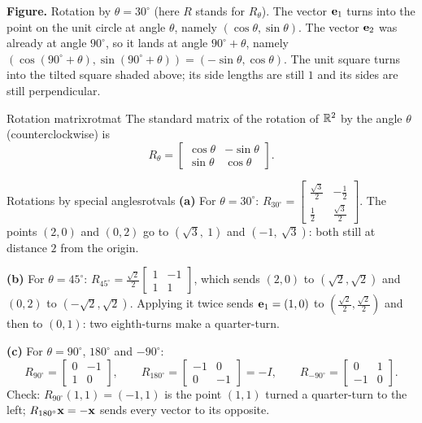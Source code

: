 \documentclass[11pt]{article}
\begin{document}
\textbf{Figure.} Rotation by $\theta=30^\circ$ (here $R$ stands for $R_\theta$). The vector $\mathbf{e}_1$ turns into the point on the unit circle at angle $\theta$, namely $(\cos\theta,\sin\theta)$. The vector $\mathbf{e}_2$ was already at angle $90^\circ$, so it lands at angle $90^\circ+\theta$, namely $(\cos(90^\circ+\theta),\sin(90^\circ+\theta))=(-\sin\theta,\cos\theta)$. The unit square turns into the tilted square shaded above; its side lengths are still $1$ and its sides are still perpendicular.

\begin{thm}{Rotation matrix}{rotmat}
The standard matrix of the rotation of $\mathbb{R}^2$ by the angle $\theta$ (counterclockwise) is
\[
R_\theta=\begin{bmatrix}\cos\theta&-\sin\theta\\\sin\theta&\cos\theta\end{bmatrix}.
\]
\end{thm}

\begin{exmp}{Rotations by special angles}{rotvals}
\textbf{(a)} For $\theta=30^\circ$: $R_{30^\circ}=\begin{bmatrix}\tfrac{\sqrt3}{2}&-\tfrac12\\\tfrac12&\tfrac{\sqrt3}{2}\end{bmatrix}$. The points $(2,0)$ and $(0,2)$ go to $(\sqrt3,\ 1)$ and $(-1,\ \sqrt3)$: both still at distance $2$ from the origin.

\textbf{(b)} For $\theta=45^\circ$: $R_{45^\circ}=\tfrac{\sqrt2}{2}\begin{bmatrix}1&-1\\1&1\end{bmatrix}$, which sends $(2,0)$ to $(\sqrt2,\sqrt2)$ and $(0,2)$ to $(-\sqrt2,\sqrt2)$. Applying it twice sends $\mathbf{e}_1=(1,0)$ to $(\tfrac{\sqrt2}{2},\tfrac{\sqrt2}{2})$ and then to $(0,1)$: two eighth-turns make a quarter-turn.

\textbf{(c)} For $\theta=90^\circ$, $180^\circ$ and $-90^\circ$:
\[
R_{90^\circ}=\begin{bmatrix}0&-1\\1&0\end{bmatrix},\qquad R_{180^\circ}=\begin{bmatrix}-1&0\\0&-1\end{bmatrix}=-I,\qquad R_{-90^\circ}=\begin{bmatrix}0&1\\-1&0\end{bmatrix}.
\]
Check: $R_{90^\circ}(1,1)=(-1,1)$ is the point $(1,1)$ turned a quarter-turn to the left; $R_{180^\circ}\mathbf{x}=-\mathbf{x}$ sends every vector to its opposite.
\end{exmp}
\end{document}
